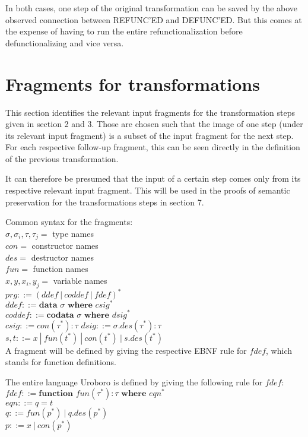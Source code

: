 \documentclass[11pt]{article} %
\begin{document}
In both cases, one step of the original transformation can be saved by the above observed connection between REFUNC'ED and DEFUNC'ED. But this comes at the expense of having to run the entire refunctionalization before defunctionalizing and vice versa.

\section{Fragments for transformations}

This section identifies the relevant input fragments for the transformation steps given in section 2 and 3. Those are chosen such that the image of one step (under its relevant input fragment) is a subset of the input fragment for the next step. For each respective follow-up fragment, this can be seen directly in the definition of the previous transformation.

It can therefore be presumed that the input of a certain step comes only from its respective relevant input fragment. This will be used in the proofs of semantic preservation for the transformations steps in section 7.

Common syntax for the fragments:\\
$\sigma, \sigma_i, \tau, \tau_j = $ type names\\
$con = $ constructor names\\
$des = $ destructor names\\
$fun = $ function names\\
$x, y, x_i, y_j = $ variable names\\
$prg ::= (ddef ~ | ~ coddef ~ | ~  fdef)^*$\\
$ddef ::= \textbf{data } \sigma \textbf{ where } csig^*$\\
$coddef ::= \textbf{codata } \sigma \textbf{ where } dsig^*$\\
$csig ::= con(\tau^*): \tau$
$dsig ::= \sigma.des(\tau^*): \tau$
$s, t ::= x ~ | ~ fun(t^*) ~ | ~ con(t^*) ~ | ~ s.des(t^*)$\\

A fragment will be defined by giving the respective EBNF rule for $fdef$, which stands for function definitions.

The entire language Uroboro is defined by giving the following rule for $fdef$:\\
$fdef ::= \textbf{function } fun(\tau^*): \tau \textbf{ where } eqn^*$\\
$eqn ::= q = t$\\
$q ::= fun(p^*) ~ | ~ q.des(p^*)$\\
$p ::= x ~ | ~ con(p^*) $\\
\end{document}
